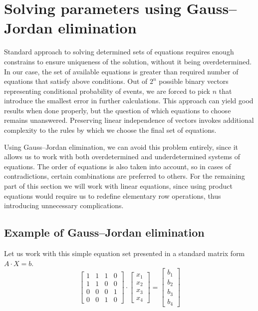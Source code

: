 \section{Solving parameters using Gauss--Jordan elimination}
Standard approach to solving determined sets of equations requires enough constrains to ensure uniqueness of the solution, without it being overdetermined.
In our case, the set of available equations is greater than required number of equations that satisfy above conditions.
Out of $2^n$ possible binary vectors representing conditional probability of events, we are forced to pick $n$ that introduce the smallest error in further calculations.
This approach can yield good results when done properly, but the question of which equations to choose remains unanswered.
Preserving linear independence of vectors invokes additional complexity to the rules by which we choose the final set of equations.

Using Gauss--Jordan elimination, we can avoid this problem entirely, since it allows us to work with both overdetermined and underdetermined systems of equations.
The order of equations is also taken into account, so in cases of contradictions, certain combinations are preferred to others.
For the remaining part of this section we will work with linear equations, since using product equations would require us to redefine elementary row operations, thus introducing unnecessary complications.
\subsection{Example of Gauss--Jordan elimination}
Let us work with this simple equation set presented in a standard matrix form $A \cdot X = b$.
\begin{equation}
    \begin{bmatrix}
        1 & 1 & 1 & 0 \\
        1 & 1 & 0 & 0 \\
        0 & 0 & 0 & 1 \\
        0 & 0 & 1 & 0
    \end{bmatrix} \cdot
    \begin{bmatrix}
        x_1 \\ x_2 \\ x_3 \\ x_4
    \end{bmatrix} = 
    \begin{bmatrix}
        b_1 \\ b_2 \\ b_3 \\ b_4
    \end{bmatrix}
\end{equation}

